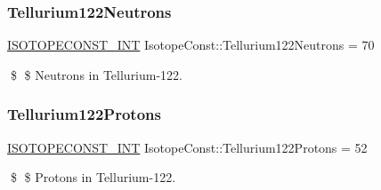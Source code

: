 \subsubsection{\texorpdfstring{Tellurium122\+Neutrons}{Tellurium122Neutrons}}
{\footnotesize\ttfamily \mbox{\hyperlink{group___isotope_const-_macros_ga5f18360b3e99483a35c32d789e62621c}{I\+S\+O\+T\+O\+P\+E\+C\+O\+N\+S\+T\+\_\+\+I\+NT}} Isotope\+Const\+::\+Tellurium122\+Neutrons = 70}

\$ \$ Neutrons in Tellurium-\/122. \mbox{\label{group___isotope_const-_tellurium-_te122_ga04e8f3876d841287a89580b248fa90e8}} 
\subsubsection{\texorpdfstring{Tellurium122\+Protons}{Tellurium122Protons}}
{\footnotesize\ttfamily \mbox{\hyperlink{group___isotope_const-_macros_ga5f18360b3e99483a35c32d789e62621c}{I\+S\+O\+T\+O\+P\+E\+C\+O\+N\+S\+T\+\_\+\+I\+NT}} Isotope\+Const\+::\+Tellurium122\+Protons = 52}

\$ \$ Protons in Tellurium-\/122. 